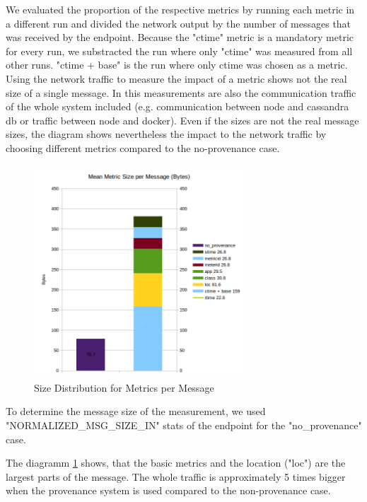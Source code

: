 We evaluated the proportion of the respective metrics by running each metric in a different run and divided the network output by the number of messages that was received by the endpoint. Because the "ctime" metric is a mandatory metric for every run, we substracted the run where only "ctime" was measured from all other runs. "ctime + base" is the run where only ctime was chosen as a metric. Using the network traffic to measure the impact of a metric shows not the real size of a single message. In this measurements are also the communication traffic of the whole system included (e.g. communication between node and cassandra db or traffic between node and docker). Even if the sizes are not the real message sizes, the diagram shows nevertheless the impact to the network traffic by choosing different metrics compared to the no-provenance case.

\begin{figure}[H]
	\center
	\includegraphics[width=0.7\textwidth]{figures/overheaddiagram1.png}
	\caption{Size Distribution for Metrics per Message}
	\label{fig:metricsdistribution}
\end{figure}


To determine the message size of the measurement, we  used  "NORMALIZED\_MSG\_SIZE\_IN" stats of the endpoint for the "no\_provenance" case.

The diagramm \ref{fig:metricsdistribution} shows, that the basic metrics and the location ("loc") are the largest parts of the message. The whole traffic is approximately 5 times bigger when the provenance system is used compared to the non-provenance case.


